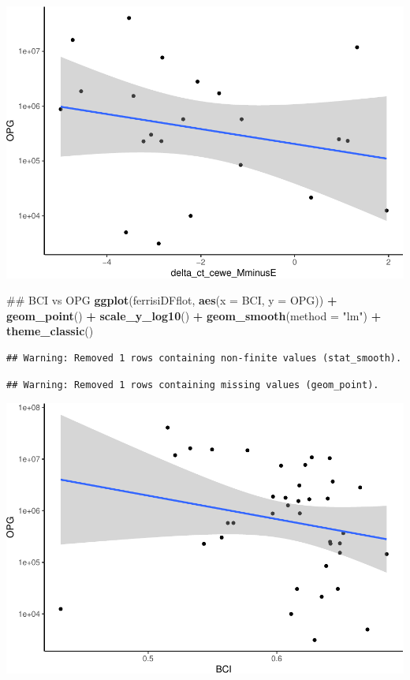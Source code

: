 \documentclass[]{article}
\newenvironment{Shaded}{\begin{snugshade}}{\end{snugshade}}
\newcommand{\KeywordTok}[1]{\textcolor[rgb]{0.13,0.29,0.53}{\textbf{#1}}}
\newcommand{\DataTypeTok}[1]{\textcolor[rgb]{0.13,0.29,0.53}{#1}}
\newcommand{\StringTok}[1]{\textcolor[rgb]{0.31,0.60,0.02}{#1}}
\newcommand{\OperatorTok}[1]{\textcolor[rgb]{0.81,0.36,0.00}{\textbf{#1}}}
\newcommand{\NormalTok}[1]{#1}
\begin{document}
\includegraphics{Data_Analysis_Alice_files/figure-latex/unnamed-chunk-1-3.pdf}

\begin{Shaded}
\begin{Highlighting}[]
\NormalTok{## BCI vs OPG}
\KeywordTok{ggplot}\NormalTok{(ferrisiDFflot, }\KeywordTok{aes}\NormalTok{(}\DataTypeTok{x =}\NormalTok{ BCI, }\DataTypeTok{y =}\NormalTok{ OPG)) }\OperatorTok{+}
\StringTok{  }\KeywordTok{geom_point}\NormalTok{() }\OperatorTok{+}
\StringTok{  }\KeywordTok{scale_y_log10}\NormalTok{() }\OperatorTok{+}
\StringTok{  }\KeywordTok{geom_smooth}\NormalTok{(}\DataTypeTok{method =} \StringTok{"lm"}\NormalTok{) }\OperatorTok{+}
\StringTok{  }\KeywordTok{theme_classic}\NormalTok{()}
\end{Highlighting}
\end{Shaded}

\begin{verbatim}
## Warning: Removed 1 rows containing non-finite values (stat_smooth).
\end{verbatim}

\begin{verbatim}
## Warning: Removed 1 rows containing missing values (geom_point).
\end{verbatim}

\includegraphics{Data_Analysis_Alice_files/figure-latex/unnamed-chunk-1-4.pdf}
\end{document}
